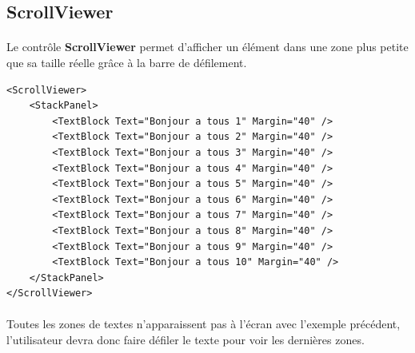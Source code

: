 \documentclass[twoside,UTF8]{EPURapport}
\begin{document}
		\subsection{ScrollViewer}

\paragraph{}
Le contrôle \textbf{ScrollViewer} permet d'afficher un élément dans une zone plus petite que sa taille réelle grâce à la barre de défilement.
 
\begin{lstlisting}[caption={Exemple d'utilisation du contrôle \textbf{ScrollViewer}}]
<ScrollViewer>
    <StackPanel>
        <TextBlock Text="Bonjour a tous 1" Margin="40" />
        <TextBlock Text="Bonjour a tous 2" Margin="40" />
        <TextBlock Text="Bonjour a tous 3" Margin="40" />
        <TextBlock Text="Bonjour a tous 4" Margin="40" />
        <TextBlock Text="Bonjour a tous 5" Margin="40" />
        <TextBlock Text="Bonjour a tous 6" Margin="40" />
        <TextBlock Text="Bonjour a tous 7" Margin="40" />
        <TextBlock Text="Bonjour a tous 8" Margin="40" />
        <TextBlock Text="Bonjour a tous 9" Margin="40" />
        <TextBlock Text="Bonjour a tous 10" Margin="40" />
    </StackPanel>
</ScrollViewer>
\end{lstlisting}
	
\paragraph{}	
Toutes les zones de textes n'apparaissent pas à l'écran avec l'exemple précédent, l'utilisateur devra donc faire défiler le texte pour voir les dernières zones.
\end{document}
